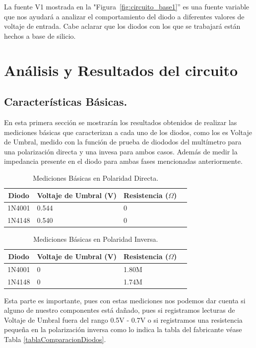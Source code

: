 \documentclass[journal]{IEEEtran}
\begin{document}
La fuente V1 mostrada en la "Figura~\ref{fig:circuito_base1}” es una fuente variable que nos ayudará a analizar el 
comportamiento del diodo a diferentes valores de voltaje de entrada. Cabe aclarar que los diodos con los que se trabajará están 
hechos a base de silicio.

\section{Análisis y Resultados del circuito}
\subsection{Características Básicas.}
En esta primera sección se mostrarán los resultados obtenidos de realizar las mediciones básicas que caracterizan a cada uno de los diodos, como los es Voltaje de Umbral, medido con la función de 
prueba de diododos del multímetro para una polarización directa y una invesa para ambos casos. Además de medir la impedancia presente en el diodo para ambas fases mencionadas anteriormente.

\begin{table}[H]
\centering
\begin{tabularx}{\columnwidth}{|c|X|X|X|}
\hline
\textbf{Diodo} & \textbf{Voltaje de Umbral (V)} & \textbf{Resistencia ($\Omega$)}\\ \hline
1N4001 & 0.544 & 0\\ \hline
1N4148 & 0.540 & 0\\ \hline
\end{tabularx}
\caption{Mediciones Básicas en Polaridad Directa.}
\label{PolaridadDirecta}
\end{table}

\begin{table}[H]
\centering
\begin{tabularx}{\columnwidth}{|c|X|X|X|}
\hline
\textbf{Diodo} & \textbf{Voltaje de Umbral (V)} & \textbf{Resistencia ($\Omega$)}\\ \hline
1N4001 & 0 & 1.80M\\ \hline
1N4148 & 0 & 1.74M\\ \hline
\end{tabularx}
\caption{Mediciones Básicas en Polaridad Inversa.}
\label{PolaridadInversa}
\end{table}
Esta parte es importante, pues con estas mediciones nos podemos dar cuenta si alguno de nuestro componentes está dañado, pues si registramos lecturas de Voltaje de Umbral 
fuera del rango 0.5V - 0.7V o si registramos una resistencia pequeña en la polarización inversa como lo indica la tabla del fabricante véase Tabla \ref{tablaComparacionDiodos}. 
\end{document}
